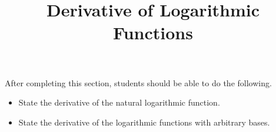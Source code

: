 \documentclass{ximera}
\title{Derivative of Logarithmic Functions}
\begin{document}
\begin{abstract}
\end{abstract}

\maketitle

\begin{sectionOutcomes}

After completing this section, students should be able to do the following.

\begin{itemize}
	\item State the derivative of the natural logarithmic function.
	\item State the derivative of the logarithmic functions with arbitrary bases.
\end{itemize}

\end{sectionOutcomes}
\end{document}
